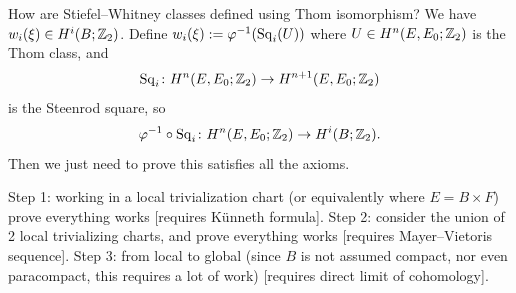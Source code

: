 \begin{node}[Foreshadowing]
How are Stiefel--Whitney classes defined using Thom isomorphism? We
have $w_{i}(\xi)\in H^{i}(B;\mathbb{Z}_{2})$. Define
$w_{i}(\xi):=\varphi^{-1}(\operatorname{Sq}_{i}(U))$ where $U\in H^{n}(E,E_{0};\mathbb{Z}_{2})$ is the 
Thom class, and
\begin{equation}
\operatorname{Sq}_{i}\colon H^{n}(E,E_{0};\mathbb{Z}_{2})\to H^{n+1}(E,E_{0};\mathbb{Z}_{2})
\end{equation}
is the Steenrod square, so
\begin{equation}
\varphi^{-1}\circ\operatorname{Sq}_{i}\colon H^{n}(E,E_{0};\mathbb{Z}_{2})\to H^{i}(B;\mathbb{Z}_{2}).
\end{equation}
Then we just need to prove this satisfies all the axioms.
\end{node}

\begin{node}
Step 1: working in a local trivialization chart (or equivalently where
$E=B\times F$) prove everything works [requires K\"{u}nneth formula]. Step 2: consider the union of 2
local trivializing charts, and prove everything works [requires
  Mayer--Vietoris sequence]. Step 3: from
local to global (since $B$ is not assumed compact, nor even
paracompact, this requires a lot of work) [requires direct limit of cohomology].
\end{node}